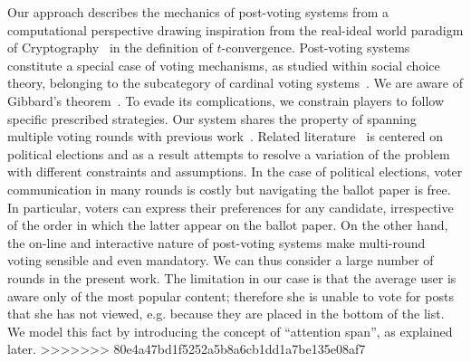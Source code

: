 Our approach describes the mechanics of post-voting systems from a computational perspective drawing inspiration from the real-ideal world paradigm of Cryptography~\cite{goldreich1999foundations,lindell} in the definition of $t$-convergence.
Post-voting systems constitute a special case of voting mechanisms, as studied within social choice theory, belonging to the subcategory of cardinal voting systems~\cite{hillinger2005case}. We are aware of Gibbard's theorem~\cite{gibbard1973manipulation}. To evade its complications, we constrain players to follow specific prescribed strategies. Our system shares the property of spanning multiple voting rounds with previous work~\cite{kalech2011practical}. Related literature~\cite{lu2011robust,conitzer2005communication,xia2010compilation} is centered on political elections and as a result attempts to resolve a variation of the problem with different constraints and assumptions. In the case of political elections, voter communication in many rounds is costly but navigating the ballot paper is free. In particular, voters can express their preferences for any candidate, irrespective of the order in which the latter appear on the ballot paper. On the other hand, the on-line and interactive nature of post-voting systems make multi-round voting sensible and even mandatory. We can thus consider a large number of rounds in the present work. The limitation in our case is that the average user is aware only of the most popular content; therefore she is unable to vote for posts that she has not viewed, e.g. because they are placed in the bottom of the list. We model this fact by introducing the concept of ``attention span'', as explained later.
>>>>>>> 80e4a47bd1f5252a5b8a6cb1dd1a7be135e08af7

